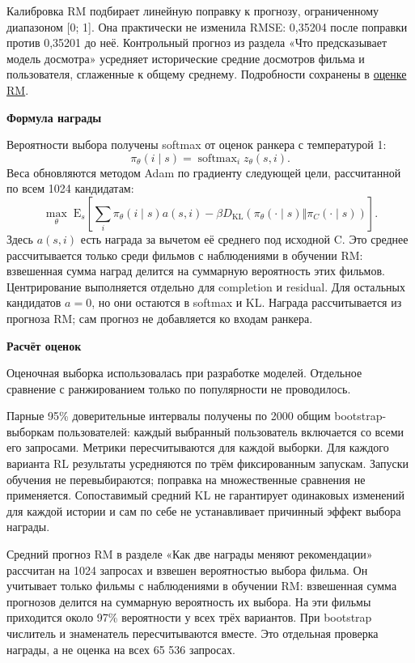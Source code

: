 \documentclass[11pt,a4paper]{article}
\begin{document}
Калибровка RM подбирает линейную поправку к прогнозу, ограниченному диапазоном [0; 1]. Она практически не изменила RMSE: 0,35204 после поправки против 0,35201 до неё. Контрольный прогноз из раздела «Что предсказывает модель досмотра» усредняет исторические средние досмотров фильма и пользователя, сглаженные к общему среднему. Подробности сохранены в \href{https://github.com/suprend/kion-rl-recsys/blob/5c6858e46705fb4baa350d36914905b061376ed3/evidence/fullstudy/rm-evaluation-metrics.json}{оценке RM}.

\textbf{Формула награды}

Вероятности выбора получены softmax от оценок ранкера с температурой 1:
\[
\pi_\theta(i\mid s)=\operatorname{softmax}_i z_\theta(s,i).
\]
Веса обновляются методом Adam по градиенту следующей цели, рассчитанной по всем 1024 кандидатам:
\[
\max_\theta\;\mathrm{E}_s\!\left[\sum_i\pi_\theta(i\mid s)a(s,i)
-\beta D_{\mathrm{KL}}(\pi_\theta(\cdot\mid s)\Vert\pi_C(\cdot\mid s))\right].
\]
Здесь \(a(s,i)\) есть награда за вычетом её среднего под исходной C. Это среднее рассчитывается только среди фильмов с наблюдениями в обучении RM: взвешенная сумма наград делится на суммарную вероятность этих фильмов. Центрирование выполняется отдельно для completion и residual. Для остальных кандидатов \(a=0\), но они остаются в softmax и KL. Награда рассчитывается из прогноза RM; сам прогноз не добавляется ко входам ранкера.

\textbf{Расчёт оценок}

Оценочная выборка использовалась при разработке моделей. Отдельное сравнение с ранжированием только по популярности не проводилось.

Парные 95\% доверительные интервалы получены по 2000 общим bootstrap-выборкам пользователей: каждый выбранный пользователь включается со всеми его запросами. Метрики пересчитываются для каждой выборки. Для каждого варианта RL результаты усредняются по трём фиксированным запускам. Запуски обучения не перевыбираются; поправка на множественные сравнения не применяется. Сопоставимый средний KL не гарантирует одинаковых изменений для каждой истории и сам по себе не устанавливает причинный эффект выбора награды.

Средний прогноз RM в разделе «Как две награды меняют рекомендации» рассчитан на 1024 запросах и взвешен вероятностью выбора фильма. Он учитывает только фильмы с наблюдениями в обучении RM: взвешенная сумма прогнозов делится на суммарную вероятность их выбора. На эти фильмы приходится около 97\% вероятности у всех трёх вариантов. При bootstrap числитель и знаменатель пересчитываются вместе. Это отдельная проверка награды, а не оценка на всех 65 536 запросах.
\end{document}
